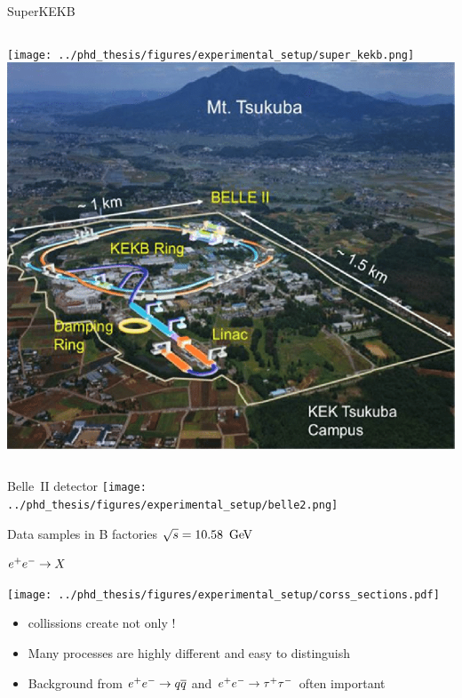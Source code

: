 \documentclass[xcolor=dvipsnames]{beamer}
\begin{document}
   \begin{frame}{SuperKEKB}
      \begin{columns}
         \texttt{[image: ../phd\_thesis/figures/experimental\_setup/super\_kekb.png]}
         \includegraphics[width=1\textwidth]{figures/Layout-of-SuperKEKB-at-the-KEK-Tsukuba-campus.png}
      \end{columns}
   \end{frame}

   \begin{frame}{Belle~II detector}
      \texttt{[image: ../phd\_thesis/figures/experimental\_setup/belle2.png]}
   \end{frame}


   \begin{frame}{Data samples in B factories}
      \small\centering
      \textbf{$\sqrt{s} = 10.58~\mathrm{\,Ge\kern -0.1em V}$}
      
      $e^+e^-\rightarrow X$

      \texttt{[image: ../phd\_thesis/figures/experimental\_setup/corss\_sections.pdf]}
      \begin{itemize}
         \item \epem collissions create not only \FourS!
         \item Many processes are highly different and easy to distinguish
         \item Background from $e^+e^-\rightarrow q\overline q$ and $e^+e^-\rightarrow\tau^+\tau^-$ often important
      \end{itemize}
   \end{frame}
\end{document}
